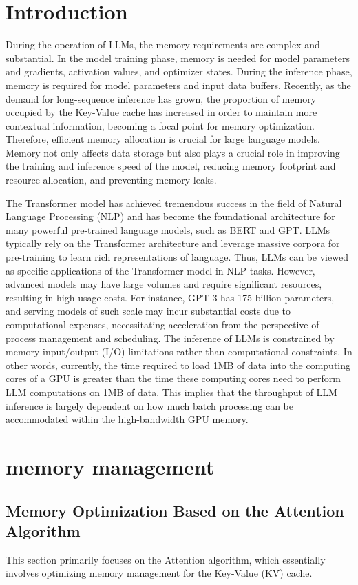 \documentclass[conference]{IEEEtran}
\begin{document}
\section{Introduction}
During the operation of LLMs, the memory requirements are complex and substantial. In the model training phase, memory is needed for model parameters and gradients, activation values, and optimizer states. During the inference phase, memory is required for model parameters and input data buffers. Recently, as the demand for long-sequence inference has grown, the proportion of memory occupied by the Key-Value cache has increased in order to maintain more contextual information, becoming a focal point for memory optimization.
Therefore, efficient memory allocation is crucial for large language models. Memory not only affects data storage but also plays a crucial role in improving the training and inference speed of the model, reducing memory footprint and resource allocation, and preventing memory leaks.

The Transformer model has achieved tremendous success in the field of Natural Language Processing (NLP) and has become the foundational architecture for many powerful pre-trained language models, such as BERT and GPT. LLMs typically rely on the Transformer architecture and leverage massive corpora for pre-training to learn rich representations of language. Thus, LLMs can be viewed as specific applications of the Transformer model in NLP tasks. However, advanced models may have large volumes and require significant resources, resulting in high usage costs. For instance, GPT-3 has 175 billion parameters, and serving models of such scale may incur substantial costs due to computational expenses, necessitating acceleration from the perspective of process management and scheduling.
The inference of LLMs is constrained by memory input/output (I/O) limitations rather than computational constraints. In other words, currently, the time required to load 1MB of data into the computing cores of a GPU is greater than the time these computing cores need to perform LLM computations on 1MB of data. This implies that the throughput of LLM inference is largely dependent on how much batch processing can be accommodated within the high-bandwidth GPU memory.
\section{memory management}
\subsection{Memory Optimization Based on the Attention Algorithm}
This section primarily focuses on the Attention algorithm, which essentially involves optimizing memory management for the Key-Value (KV) cache.
\end{document}

